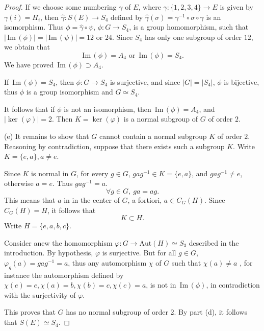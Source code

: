\documentclass[11pt,a4paper]{article}
\newcommand{\im}{\,\mathrm{Im}\,}
\begin{document}
{\begin{proof}
 If we choose some numbering $\gamma$ of $E$, where $\gamma : \{1,2,3,4\} \to E$ is given by $\gamma(i) = H_i$, then $\hat \gamma : S(E) \to S_4$ defined by $\hat \gamma(\sigma) = \gamma^{-1} \circ \sigma \circ \gamma$ is an isomorphism. Thus $\phi = \hat \gamma \circ \psi$, $\phi :  G \to S_4$, is a group homomorphism, such that $|\im(\phi)| = |\im(\psi)| = 12$ or $24$.  Since $S_4$ has only one subgroup of order $12$, we obtain that
 $$\im(\phi) = A_4 \text{ or } \im(\phi) = S_4.$$
We have proved $\im(\phi) \supset A_4$.

If $\im(\phi) = S_4$, then $\phi : G \to S_4$ is surjective, and since $|G| = |S_4|$, $\phi$ is bijective, thus $\phi$ is a group isomorphism and $G \simeq S_4$.

It follows that if $\phi$ is not an isomorphism, then $\im(\phi) = A_4 $, and $|\ker(\varphi)| = 2$. Then $K= \ker(\varphi)$ is a normal subgroup of $G$ of order $2$.

\item[(e)] It remains to show that $G$ cannot contain a normal subgroup $K$ of order $2$. Reasoning by contradiction, suppose that there exists such a subgroup $K$. Write $K = \{e,a\}, a \ne e$. 

Since $K$ is normal in $G$, for every $g \in G$, $gag^{-1} \in K = \{e,a\}$, and $gag^{-1} \ne e$, otherwise $a = e$. Thus $gag^{-1} =a$.
$$\forall g \in G, \ ga = ag.$$
This means that $a$ in in the center of $G$, a fortiori, $a \in C_G(H)$. Since $C_G(H) = H$, it follows that
$$K \subset H.$$
Write $H = \{e,a,b,c\}$.

Consider anew the homomorphism $\varphi : G \to \mathrm{Aut}(H) \simeq S_3$ described in the introduction. By hypothesis, $\varphi$ is surjective. But for all $g \in G$, $\varphi_g(a) = gag^{-1} =a$, thus any automorphism $\chi$ of $G$ such that $\chi(a) \ne a$ , for instance the automorphism defined by $\chi(e) = e, \chi(a) = b, \chi(b) = c, \chi(c) = a$, is not in $\im(\phi)$, in contradiction with the surjectivity of $\varphi$.

This proves that $G$ has no normal subgroup of order 2. By part (d), it follows that $S(E) \simeq S_4$.
\end{proof}

}
\end{document}

